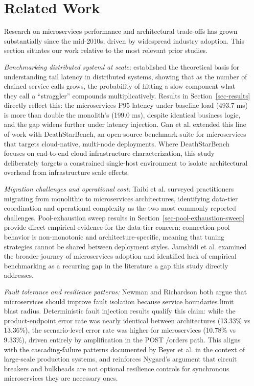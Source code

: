 \documentclass[smallextended,natbib]{svjour3}
\begin{document}
\section{Related Work}

Research on microservices performance and architectural trade-offs has grown substantially since the mid-2010s, driven by widespread industry adoption. This section situates our work relative to the most relevant prior studies.

\textit{Benchmarking distributed systeml at scale:} \cite{dean_tail_at_scale} established the theoretical basis for understanding tail latency in distributed systems, showing that as the number of chained service calls grows, the probability of hitting a slow component what they call a ``straggler'' compounds multiplicatively. Results in Section~\ref{sec-results} directly reflect this: the microservices P95 latency under baseline load (493.7 ms) is more than double the monolith's (199.0 ms), despite identical business logic, and the gap widens further under latency injection. Gan et al. \cite{deathstarbench} extended this line of work with DeathStarBench, an open-source benchmark suite for microservices that targets cloud-native, multi-node deployments. Where DeathStarBench focuses on end-to-end cloud infrastructure characterization, this study deliberately targets a constrained single-host environment to isolate architectural overhead from infrastructure scale effects.

\textit{Migration challenges and operational cost:} Taibi et al. \cite{taibi2017processes} surveyed practitioners migrating from monolithic to microservices architectures, identifying data-tier coordination and operational complexity as the two most commonly reported challenges. Pool-exhaustion sweep results in Section~\ref{sec-pool-exhaustion-sweep} provide direct empirical evidence for the data-tier concern: connection-pool behavior is non-monotonic and architecture-specific, meaning that tuning strategies cannot be shared between deployment styles. Jamshidi et al. \cite{jamshidi2018microservices} examined the broader journey of microservices adoption and identified lack of empirical benchmarking as a recurring gap in the literature a gap this study directly addresses.

\textit{Fault tolerance and resilience patterns:} Newman \cite{newman_microservices} and Richardson \cite{richardson_microservices} both argue that microservices should improve fault isolation because service boundaries limit blast radius. Deterministic fault injection results qualify this claim: while the product-endpoint error rate was nearly identical between architectures (13.33\% vs 13.36\%), the scenario-level error rate was higher for microservices (10.78\% vs 9.33\%), driven entirely by amplification in the POST /orders path. This aligns with the cascading-failure patterns documented by Beyer et al. \cite{google_sre} in the context of large-scale production systems, and reinforces Nygard's \cite{resilience_patterns} argument that circuit breakers and bulkheads are not optional resilience controls for synchronous microservices they are necessary ones.
\end{document}
